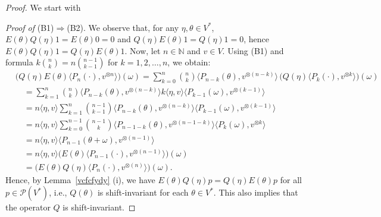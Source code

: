 \documentclass[12pt]{article}
\theoremstyle{remark}
\theoremstyle{remark}
\theoremstyle{remark}
\begin{document}
\begin{proof} We start with 

{\it Proof of\/} (B1)$\Rightarrow$(B2). We observe that, for any $\eta, \theta \in V^*$,
$E(\theta)Q(\eta)1=E(\theta)0=0$ and $Q(\eta)E(\theta)1=Q(\eta)1=0$,
 hence $E(\theta)Q(\eta)1=Q(\eta)E(\theta)1$. Now, let $n\in\mathbb N$ and $v\in V$. Using (B1) and formula $k\binom nk=n\binom{n-1}{k-1}$  for $k=1,2,\dots,n$, we obtain: 
\begin{align*}
&\big(Q(\eta)E(\theta)\langle P_n(\cdot),v^{\otimes n}\rangle\big)(\omega)
=\sum_{k=0}^n{n \choose k}\langle P_{n-k}(\theta), v^{\otimes(n-k)}\rangle\, \big(Q(\eta)\langle P_k(\cdot),v^{\otimes k}\rangle\big)(\omega)\\
&\quad =\sum_{k=1}^n{n \choose k}\langle P_{n-k}(\theta),v^{\otimes(n-k)}\rangle k\langle \eta,v \rangle \langle P_{k-1}(\omega),v^{\otimes(k-1)}\rangle\\
&\quad=n\langle \eta,v \rangle \sum_{k=1}^n{n-1 \choose k-1}\langle P_{n-k}(\theta),v^{\otimes(n-k)}\rangle \langle P_{k-1}(\omega),v^{\otimes(k-1)}\rangle\\
&\quad=n\langle \eta,v \rangle \sum_{k=0}^{n-1}{n-1 \choose k}\langle P_{n-1-k}(\theta),v^{\otimes(n-1-k)}\rangle \langle P_k(\omega),v^{\otimes k}\rangle\\
&\quad=n\langle \eta,v \rangle \langle P_{n-1}(\theta+\omega),v^{\otimes(n-1)}\rangle\\
&\quad=n\langle \eta,v \rangle \big(E(\theta) \langle P_{n-1}(\cdot),v^{\otimes(n-1)}\rangle\big)(\omega)\\
&\quad=\big(E(\theta)Q(\eta) \langle P_{n}(\cdot),v^{\otimes(n)}\rangle\big)(\omega).
\end{align*}
Hence, by Lemma~\ref{vcfcfydy} (i), we have $E(\theta)Q(\eta)p=Q(\eta)E(\theta)p$ for all $p\in \mathcal P  (V^*)$, i.e., $Q(\theta)$ is shift-invariant for each $\theta\in V^*$. This also implies that the operator $Q$ is shift-invariant. 



\end{proof}
\end{document}
